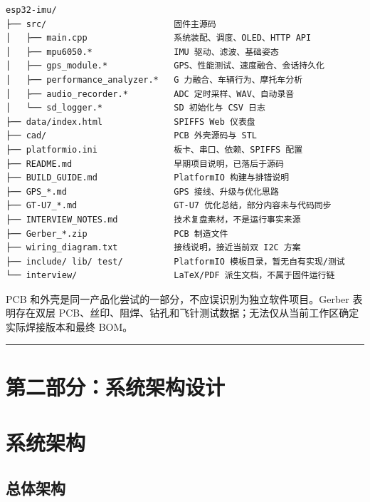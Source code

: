 \documentclass[
  UTF8,11pt,a4paper]{ctexart}
\begin{document}
\begin{lstlisting}
esp32-imu/
├── src/                         固件主源码
│   ├── main.cpp                 系统装配、调度、OLED、HTTP API
│   ├── mpu6050.*                IMU 驱动、滤波、基础姿态
│   ├── gps_module.*             GPS、性能测试、速度融合、会话持久化
│   ├── performance_analyzer.*   G 力融合、车辆行为、摩托车分析
│   ├── audio_recorder.*         ADC 定时采样、WAV、自动录音
│   └── sd_logger.*              SD 初始化与 CSV 日志
├── data/index.html              SPIFFS Web 仪表盘
├── cad/                         PCB 外壳源码与 STL
├── platformio.ini               板卡、串口、依赖、SPIFFS 配置
├── README.md                    早期项目说明，已落后于源码
├── BUILD_GUIDE.md               PlatformIO 构建与排错说明
├── GPS_*.md                     GPS 接线、升级与优化思路
├── GT-U7_*.md                   GT-U7 优化总结，部分内容未与代码同步
├── INTERVIEW_NOTES.md           技术复盘素材，不是运行事实来源
├── Gerber_*.zip                 PCB 制造文件
├── wiring_diagram.txt           接线说明，接近当前双 I2C 方案
├── include/ lib/ test/          PlatformIO 模板目录，暂无自有实现/测试
└── interview/                   LaTeX/PDF 派生文档，不属于固件运行链
\end{lstlisting}

PCB 和外壳是同一产品化尝试的一部分，不应误识别为独立软件项目。Gerber
表明存在双层
PCB、丝印、阻焊、钻孔和飞针测试数据；无法仅从当前工作区确定实际焊接版本和最终
BOM。

\begin{center}\rule{0.5\linewidth}{0.5pt}\end{center}

\section{第二部分：系统架构设计}\label{ux7b2cux4e8cux90e8ux5206ux7cfbux7edfux67b6ux6784ux8bbeux8ba1}

\section{系统架构}\label{ux7cfbux7edfux67b6ux6784}

\subsection{总体架构}\label{ux603bux4f53ux67b6ux6784}
\end{document}
